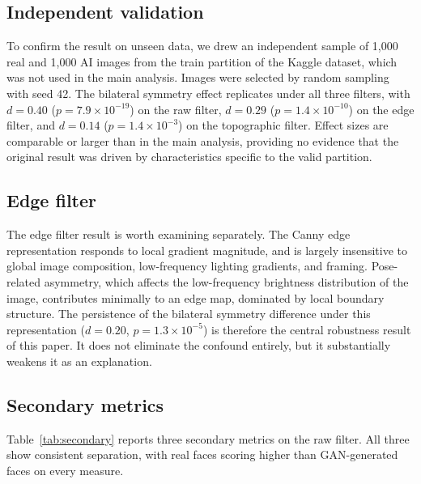 \documentclass[11pt,a4paper]{article}
\begin{document}
\subsection{Independent validation}

To confirm the result on unseen data, we drew an independent sample of 1,000
real and 1,000 AI images from the train partition of the Kaggle dataset, which
was not used in the main analysis. Images were selected by random sampling with
seed 42. The bilateral symmetry effect replicates under all three filters, with
$d = 0.40$ ($p = 7.9 \times 10^{-19}$) on the raw filter, $d = 0.29$
($p = 1.4 \times 10^{-10}$) on the edge filter, and $d = 0.14$
($p = 1.4 \times 10^{-3}$) on the topographic filter. Effect sizes are
comparable or larger than in the main analysis, providing no evidence that the
original result was driven by characteristics specific to the valid partition.

\subsection{Edge filter}

The edge filter result is worth examining separately. The Canny edge representation
responds to local gradient magnitude, and is largely insensitive to global image
composition, low-frequency lighting gradients, and framing. Pose-related
asymmetry, which affects the low-frequency brightness distribution of the image,
contributes minimally to an edge map, dominated by local boundary structure. The
persistence of the bilateral symmetry difference under this representation
($d = 0.20$, $p = 1.3 \times 10^{-5}$) is therefore the central robustness
result of this paper. It does not eliminate the confound entirely, but it
substantially weakens it as an explanation.

\subsection{Secondary metrics}

Table~\ref{tab:secondary} reports three secondary metrics on the raw filter. All
three show consistent separation, with real faces scoring higher than
GAN-generated faces on every measure.
\end{document}
